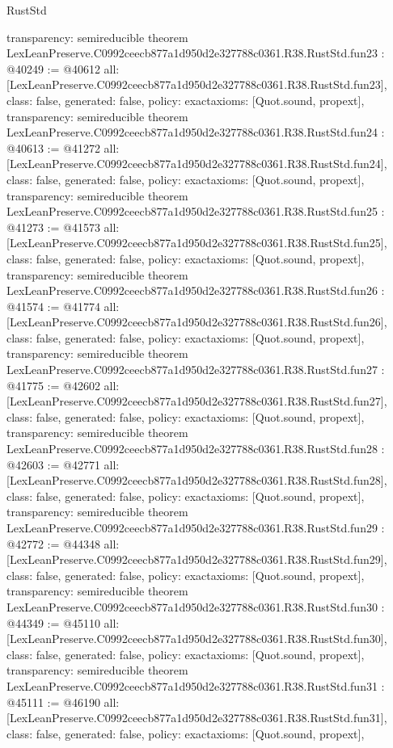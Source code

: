 \begin{lexlean}{RustStd}
\begin{coremodule}
{  transparency: semireducible
}
theorem LexLeanPreserve.C0992ceecb877a1d950d2e327788c0361.R38.RustStd.fun23 : @40249 := @40612 {
  all: [LexLeanPreserve.C0992ceecb877a1d950d2e327788c0361.R38.RustStd.fun23],
  class: false,
  generated: false,
  policy: exact{axioms: [Quot.sound, propext]},
  transparency: semireducible
}
theorem LexLeanPreserve.C0992ceecb877a1d950d2e327788c0361.R38.RustStd.fun24 : @40613 := @41272 {
  all: [LexLeanPreserve.C0992ceecb877a1d950d2e327788c0361.R38.RustStd.fun24],
  class: false,
  generated: false,
  policy: exact{axioms: [Quot.sound, propext]},
  transparency: semireducible
}
theorem LexLeanPreserve.C0992ceecb877a1d950d2e327788c0361.R38.RustStd.fun25 : @41273 := @41573 {
  all: [LexLeanPreserve.C0992ceecb877a1d950d2e327788c0361.R38.RustStd.fun25],
  class: false,
  generated: false,
  policy: exact{axioms: [Quot.sound, propext]},
  transparency: semireducible
}
theorem LexLeanPreserve.C0992ceecb877a1d950d2e327788c0361.R38.RustStd.fun26 : @41574 := @41774 {
  all: [LexLeanPreserve.C0992ceecb877a1d950d2e327788c0361.R38.RustStd.fun26],
  class: false,
  generated: false,
  policy: exact{axioms: [Quot.sound, propext]},
  transparency: semireducible
}
theorem LexLeanPreserve.C0992ceecb877a1d950d2e327788c0361.R38.RustStd.fun27 : @41775 := @42602 {
  all: [LexLeanPreserve.C0992ceecb877a1d950d2e327788c0361.R38.RustStd.fun27],
  class: false,
  generated: false,
  policy: exact{axioms: [Quot.sound, propext]},
  transparency: semireducible
}
theorem LexLeanPreserve.C0992ceecb877a1d950d2e327788c0361.R38.RustStd.fun28 : @42603 := @42771 {
  all: [LexLeanPreserve.C0992ceecb877a1d950d2e327788c0361.R38.RustStd.fun28],
  class: false,
  generated: false,
  policy: exact{axioms: [Quot.sound, propext]},
  transparency: semireducible
}
theorem LexLeanPreserve.C0992ceecb877a1d950d2e327788c0361.R38.RustStd.fun29 : @42772 := @44348 {
  all: [LexLeanPreserve.C0992ceecb877a1d950d2e327788c0361.R38.RustStd.fun29],
  class: false,
  generated: false,
  policy: exact{axioms: [Quot.sound, propext]},
  transparency: semireducible
}
theorem LexLeanPreserve.C0992ceecb877a1d950d2e327788c0361.R38.RustStd.fun30 : @44349 := @45110 {
  all: [LexLeanPreserve.C0992ceecb877a1d950d2e327788c0361.R38.RustStd.fun30],
  class: false,
  generated: false,
  policy: exact{axioms: [Quot.sound, propext]},
  transparency: semireducible
}
theorem LexLeanPreserve.C0992ceecb877a1d950d2e327788c0361.R38.RustStd.fun31 : @45111 := @46190 {
  all: [LexLeanPreserve.C0992ceecb877a1d950d2e327788c0361.R38.RustStd.fun31],
  class: false,
  generated: false,
  policy: exact{axioms: [Quot.sound, propext]},
}
\end{coremodule}
\end{lexlean}
